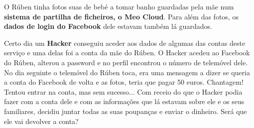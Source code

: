 O Rúben tinha fotos suas de bebé a tomar banho guardadas pela mãe num \textbf{sistema de partilha de ficheiros, o Meo Cloud}. Para além das fotos, os \textbf{dados de login do Facebook} dele estavam também lá guardados. 

Certo dia um \textbf{Hacker} conseguiu aceder aos dados de algumas das contas deste serviço e uma delas foi a conta da mãe do Rúben. O Hacker acedeu ao Facebook do Rúben, alterou a password e no perfil encontrou o número de telemóvel dele. No dia seguinte o telemóvel do Rúben toca, era uma mensagem a dizer se queria a conta do Facebook de volta e as fotos, teria que pagar 50 euros. Chantagem! Tentou entrar na conta, mas sem sucesso... Com receio do que o Hacker podia fazer com a conta dele e com as informações que lá estavam sobre ele e os seus familiares, decidiu juntar todas as suas poupanças e enviar o dinheiro. Será que ele vai devolver a conta?
